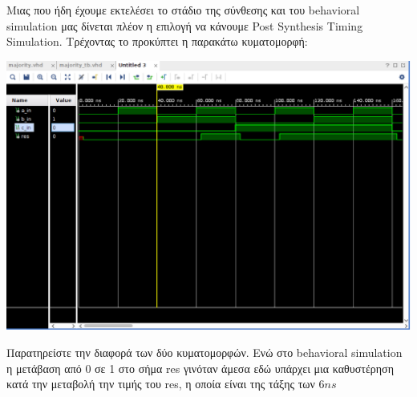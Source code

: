 \documentclass[]{article}
\begin{document}
\newpage

Μιας που ήδη έχουμε εκτελέσει το στάδιο της σύνθεσης και του behavioral simulation μας δίνεται πλέον η επιλογή να κάνουμε Post Synthesis Timing Simulation.
Τρέχοντας το προκύπτει η παρακάτω κυματομορφή:
\begin{center}
  \includegraphics[width=\textwidth]{post_synthesis_timing.png}
\end{center}

Παρατηρείστε την διαφορά των δύο κυματομορφών. Ενώ στο behavioral simulation η μετάβαση από 0 σε 1 στο σήμα res γινόταν άμεσα εδώ
υπάρχει μια καθυστέρηση κατά την μεταβολή την τιμής του res, η οποία είναι της τάξης των $6ns$
\end{document}
